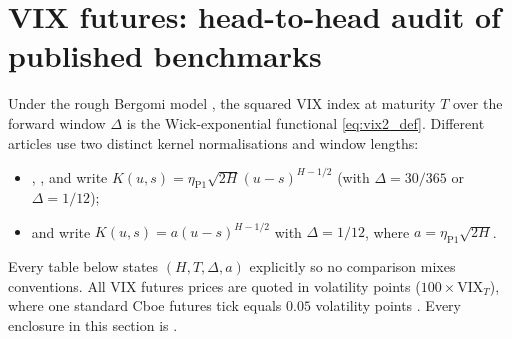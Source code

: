 \section{VIX futures: head-to-head \RoughCert{} audit of published benchmarks}\label{sec:vix_futures}

Under the rough Bergomi model \citep{BayerFrizGatheral2016}, the squared VIX index at maturity $T$ over
the forward window $\Delta$ is the Wick-exponential functional \eqref{eq:vix2_def}. Different articles
use two distinct kernel normalisations and window lengths:
\begin{itemize}
\item \citet{BayerFrizGatheral2016}, \citet{JacquierMartiniMuguruza2018}, and \citet{BonesiniCallegaroJacquier2023}
  write $K(u,s)=\eta_{\mathrm{P1}}\sqrt{2H}(u-s)^{H-1/2}$ (with $\Delta=30/365$ or $\Delta=1/12$);
\item \citet{BourgeyDeMarco2022} and \citet{BourgeyDeMarcoGobet2023} write $K(u,s)=a(u-s)^{H-1/2}$ with
  $\Delta=1/12$, where $a=\eta_{\mathrm{P1}}\sqrt{2H}$.
\end{itemize}
Every table below states $(H,T,\Delta,a)$ explicitly so no comparison mixes conventions. All VIX futures
prices are quoted in volatility points ($100\times\mathrm{VIX}_T$), where one standard Cboe futures tick
equals $0.05$ volatility points \citep{CBOE2024VIX}. Every enclosure in this section is .


